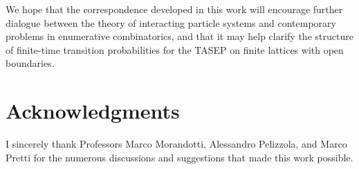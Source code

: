 \documentclass{article}
\begin{document}
We hope that the correspondence developed in this work will encourage further dialogue
between the theory of interacting particle systems and contemporary problems in
enumerative combinatorics, and that it may help clarify the structure of finite-time
transition probabilities for the TASEP on finite lattices with open boundaries.








\section*{Acknowledgments}
I sincerely thank Professors Marco Morandotti, Alessandro Pelizzola, and Marco Pretti for the numerous discussions and suggestions that made this work possible.





\end{document}
